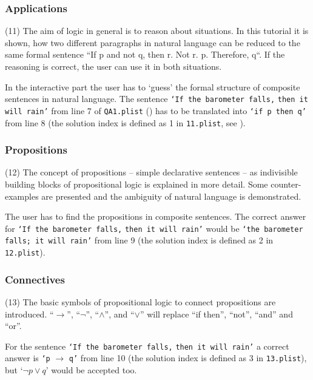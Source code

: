 \subsubsection{Applications}
\label{tut:11}

(11) The aim of logic in general is to reason about situations.\cite{Huth:2004:LCS:975331} 
In this tutorial it is shown, how two different paragraphs in natural language 
can be reduced to the same formal sentence “If p and not q, then r. Not r. p. Therefore, q“. 
If the reasoning is correct, the user can use it in both situations. 

In the interactive part the user has to ‘guess’ the formal structure of composite sentences in natural language. 
The sentence 
\verb+‘If the barometer falls,+ \verb+then it will rain’+ 
from line 7 of \verb+QA1.plist+ ()
has to be translated into
\verb+‘if p then q’+ from line 8 (the solution index is defined as 1 in \verb+11.plist+, see ).

\subsubsection{Propositions}
\label{tut:12}

(12) The concept of propositions – simple declarative sentences – 
as indivisible building blocks of propositional logic 
is explained in more detail. Some counter-examples are presented 
and the ambiguity of natural language is demonstrated.

The user has to find the propositions in composite sentences. 
The correct answer for 
\verb+‘If the barometer falls,+ \verb+then it will rain’+ 
would be  
\verb+‘the barometer falls; it will rain’+ 
from line 9 
(the solution index is defined as 2 in \verb+12.plist+).


\subsubsection{Connectives}
\label{tut:13}

(13) The basic symbols of propositional logic to connect propositions are introduced. 
“$\rightarrow$”, “$\neg$”, “$\wedge$”, and “$\vee$”
 will replace “if then”, “not”, “and” and “or”. 

For the sentence
\verb+‘If the barometer falls,+ \verb+then it will rain’+ 
a correct answer is
\verb+‘p+ $\rightarrow$ \verb+q’+ 
from line 10 
(the solution index is defined as 3 in \verb+13.plist+),
but 
‘$\neg p \vee q$’ would be accepted too.

